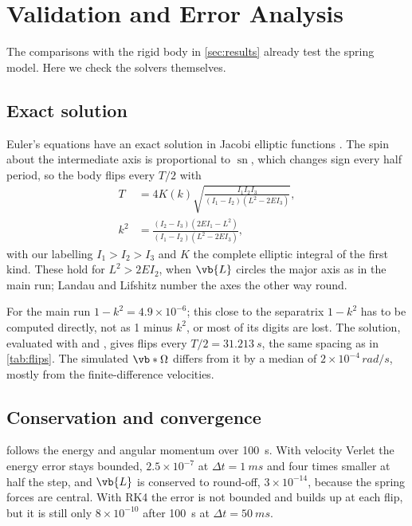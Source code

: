 \section{Validation and Error Analysis}
\label{sec:validation}
\begin{sloppypar}
The comparisons with the rigid body in \cref{sec:results} already test the spring model. Here we check the solvers themselves.
\end{sloppypar}

\subsection{Exact solution}
\label{sec:analytic}
Euler's equations have an exact solution in Jacobi elliptic functions \cite{landau}.
The spin about the intermediate axis is proportional to $\operatorname{sn}$, which changes sign every half period, so the body flips every $T/2$ with
\begin{equation}
\begin{aligned}
    T &= 4K(k)\sqrt{\frac{I_1I_2I_3}{(I_1-I_2)(L^2-2EI_3)}},\\
    k^2 &= \frac{(I_2-I_3)(2EI_1-L^2)}{(I_1-I_2)(L^2-2EI_3)},
\end{aligned}
    \label{eq:jacobi-period}
\end{equation}
with our labelling $I_1>I_2>I_3$ and $K$ the complete elliptic integral of the first kind.
These hold for $L^2>2EI_2$, when $\vb{L}$ circles the major axis as in the main run; Landau and Lifshitz \cite{landau} number the axes the other way round.
\begin{sloppypar} %
For the main run $1-k^2=4.9\times10^{-6}$; this close to the separatrix $1-k^2$ has to be computed directly, not as 1 minus $k^2$, or most of its digits are lost.
The solution, evaluated with  and  \cite{scipy}, gives flips every $T/2=\SI{31.213}{s}$, the same spacing as in \cref{tab:flips}.
The simulated $\vb*{\Omega}$ differs from it by a median of $2\times10^{-4}\,\si{rad/s}$, mostly from the finite-difference velocities.
\end{sloppypar}

\subsection{Conservation and convergence}
\label{sec:conservation}
 follows the energy and angular momentum over \SI{100}{s}.
With velocity Verlet the energy error stays bounded, $2.5\times10^{-7}$ at $\Delta t=\SI{1}{ms}$ and four times smaller at half the step, and $\vb{L}$ is conserved to round-off, $3\times10^{-14}$, because the spring forces are central.
With RK4 the error is not bounded and builds up at each flip, but it is still only $8\times10^{-10}$ after \SI{100}{s} at $\Delta t=\SI{50}{ms}$.

